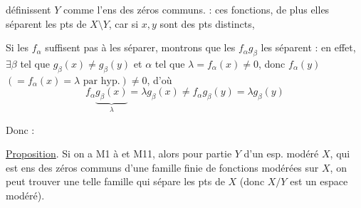 
définissent $Y$ comme l'ens des zéros communs.  : ces fonctions, de plus elles séparent les pts de $X\setminus Y$, car si $x,y$ sont des pts distincts, 

Si les $f_\alpha$  suffisent pas à les séparer, montrons que les $f_\alpha g_\beta$ les séparent : en effet, $\exists\beta$ tel que $g_\beta(x)\ne g_\beta(y)$  et $\alpha$ tel que $\lambda=f_\alpha(x)\ne0$, donc $f_\alpha(y)$ $(=f_\alpha(x)=\lambda\text{ par hyp.})\ne0$, d'où
\[
f_\alpha\underbrace{g_\beta(x)}_{\lambda}=\lambda g_\beta(x)\ne f_\alpha g_\beta(y)=\lambda g_\beta(y)
\]

Donc :

\uline{Proposition}. Si on a M1 à  et M11, alors pour  partie   $Y$ d'un esp. modéré $X$, qui est ens des zéros communs d'une famille finie de fonctions modérées sur $X$, on peut trouver une telle famille qui sépare les pts de $X$ (donc $X/Y$ est un espace modéré).

